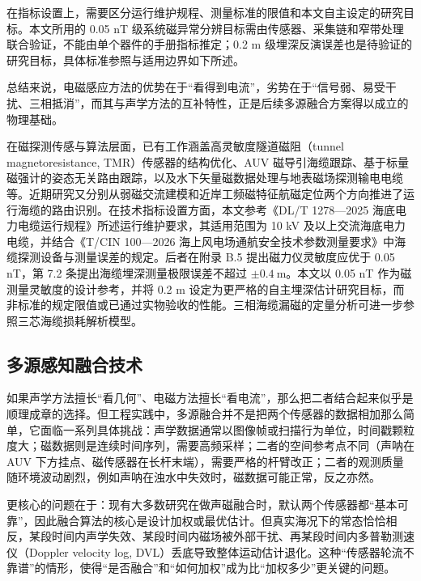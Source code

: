 在指标设置上，需要区分运行维护规程、测量标准的限值和本文自主设定的研究目标。本文所用的 0.05 nT 级系统磁异常分辨目标需由传感器、采集链和窄带处理联合验证，不能由单个器件的手册指标推定；0.2 m 级埋深反演误差也是待验证的研究目标，具体标准参照与适用边界如下所述。

总结来说，电磁感应方法的优势在于``看得到电流''，劣势在于``信号弱、易受干扰、三相抵消''，而其与声学方法的互补特性，正是后续多源融合方案得以成立的物理基础。

在磁探测传感与算法层面，已有工作涵盖高灵敏度隧道磁阻（tunnel magnetoresistance, TMR）传感器的结构优化\cite{bi2025tmr}、AUV 磁导引海缆跟踪\cite{xiang2016subsea,zhang2023adaptive}、基于标量磁强计的姿态无关路由跟踪\cite{li2024attitude}，以及水下矢量磁数据处理\cite{seidel2023uxo,oehler2024processing}与地表磁场探测输电电缆\cite{sun2014underground}等。近期研究又分别从弱磁交流建模\cite{su2025precise}和近岸工频磁特征航磁定位\cite{sun2026magnetic}两个方向推进了运行海缆的路由识别。在技术指标设置方面，本文参考《DL/T 1278---2025 海底电力电缆运行规程》所述运行维护要求，其适用范围为 10 kV 及以上交流海底电力电缆\cite{dlt1278_2025}，并结合《T/CIN 100---2026 海上风电场通航安全技术参数测量要求》中海缆探测设备与测量误差的规定\cite{tcin100_2026}。后者在附录 B.5 提出磁力仪灵敏度应优于 0.05 nT，第 7.2 条提出海缆埋深测量极限误差不超过 $\pm0.4~\mathrm{m}$。本文以 0.05 nT 作为磁测量灵敏度的设计参考，并将 0.2 m 设定为更严格的自主埋深估计研究目标，而非标准的规定限值或已通过实物验收的性能。三相海缆漏磁的定量分析可进一步参照三芯海缆损耗解析模型\cite{hatlo2015accurate}。

\subsection{多源感知融合技术}\label{sec:ch01-1-2-3}

如果声学方法擅长``看几何''、电磁方法擅长``看电流''，那么把二者结合起来似乎是顺理成章的选择。但工程实践中，多源融合并不是把两个传感器的数据相加那么简单，它面临一系列具体挑战：声学数据通常以图像帧或扫描行为单位，时间戳颗粒度大；磁数据则是连续时间序列，需要高频采样；二者的空间参考点不同（声呐在 AUV 下方挂点、磁传感器在长杆末端），需要严格的杆臂改正；二者的观测质量随环境波动剧烈，例如声呐在浊水中失效时，磁数据可能正常，反之亦然。

更核心的问题在于：现有大多数研究在做声磁融合时，默认两个传感器都``基本可靠''，因此融合算法的核心是设计加权或最优估计。但真实海况下的常态恰恰相反，某段时间内声学失效、某段时间内磁场被外部干扰、再某段时间内多普勒测速仪（Doppler velocity log, DVL）丢底导致整体运动估计退化。这种``传感器轮流不靠谱''的情形，使得``是否融合''和``如何加权''成为比``加权多少''更关键的问题。

